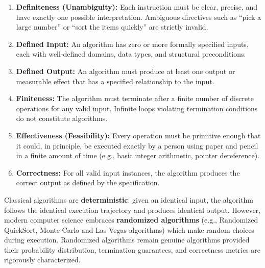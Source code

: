 \documentclass[11pt,a4paper]{article}
\begin{document}
\begin{enumerate}[leftmargin=2em, itemsep=3pt]
    \item \textbf{Definiteness (Unambiguity):} Each instruction must be clear, precise, and have exactly one possible interpretation. Ambiguous directives such as ``pick a large number'' or ``sort the items quickly'' are strictly invalid.
    \item \textbf{Defined Input:} An algorithm has zero or more formally specified inputs, each with well-defined domains, data types, and structural preconditions.
    \item \textbf{Defined Output:} An algorithm must produce at least one output or measurable effect that has a specified relationship to the input.
    \item \textbf{Finiteness:} The algorithm must terminate after a finite number of discrete operations for any valid input. Infinite loops violating termination conditions do not constitute algorithms.
    \item \textbf{Effectiveness (Feasibility):} Every operation must be primitive enough that it could, in principle, be executed exactly by a person using paper and pencil in a finite amount of time (e.g., basic integer arithmetic, pointer dereference).
    \item \textbf{Correctness:} For all valid input instances, the algorithm produces the correct output as defined by the specification.
\end{enumerate}

\begin{notebox}
Classical algorithms are \textbf{deterministic}: given an identical input, the algorithm follows the identical execution trajectory and produces identical output. However, modern computer science embraces \textbf{randomized algorithms} (e.g., Randomized QuickSort, Monte Carlo and Las Vegas algorithms) which make random choices during execution. Randomized algorithms remain genuine algorithms provided their probability distribution, termination guarantees, and correctness metrics are rigorously characterized.
\end{notebox}
\end{document}
